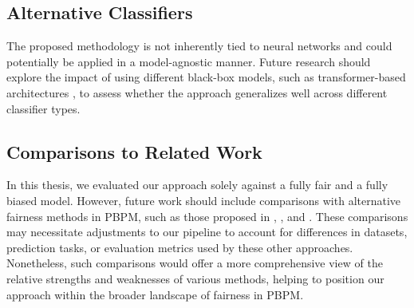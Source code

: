\subsection*{Alternative Classifiers}
The proposed methodology is not inherently tied to neural networks and could potentially be applied in a model-agnostic manner.
Future research should explore the impact of using different black-box models,
such as transformer-based architectures \cite{process_transformer},
to assess whether the approach generalizes well across different classifier types.

\subsection*{Comparisons to Related Work}
In this thesis, we evaluated our approach solely against a fully fair and a fully biased model.
However, future work should include comparisons with alternative fairness methods in PBPM,
such as those proposed in \cite{fairness_foundation}, \cite{fairness_adversarial}, and \cite{fairness_independence}.
These comparisons may necessitate adjustments to our pipeline to account for differences in datasets,
prediction tasks, or evaluation metrics used by these other approaches.
Nonetheless, such comparisons would offer a more comprehensive view
of the relative strengths and weaknesses of various methods,
helping to position our approach within the broader landscape of fairness in PBPM.